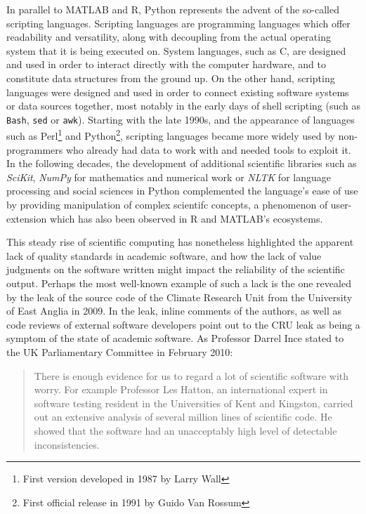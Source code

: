 In parallel to MATLAB and R, Python represents the advent of the so-called scripting languages. Scripting languages are programming  languages which offer readability and versatility, along with decoupling from the actual operating system that it is being executed on. System languages, such as C, are designed and used in order to interact directly with the computer hardware, and to constitute data structures from the ground up\cite{ousterhout_scripting_1998}. On the other hand, scripting languages were designed and used in order to connect existing software systems or data sources together, most notably in the early days of shell scripting (such as \lstinline{Bash}, \lstinline{sed} or \lstinline{awk}). Starting with the late 1990s, and the appearance of languages such as Perl\footnote{First version developed in 1987 by Larry Wall} and Python\footnote{First official release in 1991 by Guido Van Rossum}, scripting languages became more widely used by non-programmers who already had data to work with and needed tools to exploit it. In the following decades, the development of additional scientific libraries such as \emph{SciKit}, \emph{NumPy} for mathematics and numerical work or \emph{NLTK} for language processing and social sciences in Python complemented the language's ease of use by providing manipulation of complex scientifc concepts\cite{millman_python_2011}, a phenomenon of user-extension which has also been observed in R and MATLAB's ecosystems\cite{moler_history_2020}.

This steady rise of scientific computing has nonetheless highlighted the apparent lack of quality standards in academic software, and how the lack of value judgments on the software written might impact the reliability of the scientific output. Perhaps the most well-known example of such a lack is the one revealed by the leak of the source code of the Climate Research Unit from the University of East Anglia in 2009\cite{merali_computational_2010}. In the leak, inline comments of the authors, as well as code reviews of external software developers point out to the CRU leak as being a symptom of the state of academic software. As Professor Darrel Ince stated to the UK Parliamentary Committee in February 2010:

\begin{quote}
  There is enough evidence for us to regard a lot of scientific software with worry. For example Professor Les Hatton, an international expert in software testing resident in the Universities of Kent and Kingston, carried out an extensive analysis of several million lines of scientific code. He showed that the software had an unacceptably high level of detectable inconsistencies.\cite{committee_disclosure_2010}
\end{quote}

